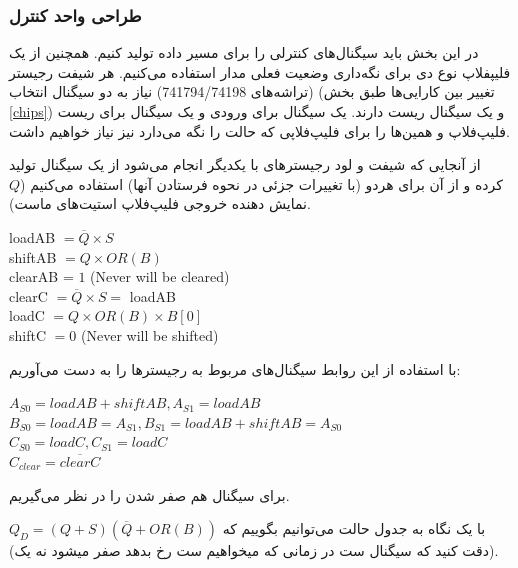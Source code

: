 \documentclass{article}
\begin{document}
\subsubsection{طراحی واحد کنترل}
در این بخش باید سیگنال‌های کنترلی را برای مسیر داده تولید کنیم. همچنین از یک فلیپفلاپ نوع دی برای نگه‌داری وضعیت فعلی مدار استفاده می‌کنیم. هر شیفت رجیستر (تراشه‌های 741794/74198) نیاز به دو سیگنال انتخاب (تغییر بین کارایی‌ها طبق بخش \ref{chips}) و یک سیگنال ریست دارند. یک سیگنال برای ورودی و یک سیگنال برای ریست فلیپ‌فلاپ  و همین‌ها را برای فلیپ‌فلاپی که حالت را نگه می‌دارد نیز نیاز خواهیم داشت. 

از آنجایی که شیفت و لود رجیسترهای  با یکدیگر انجام می‌شود از یک سیگنال تولید کرده و از آن برای هردو (با تغییرات جزئی در نحوه فرستادن آنها) استفاده می‌کنیم ($Q$ نمایش دهنده خروجی فلیپ‌فلاپ استیت‌های ماست).

\begin{latin}
\noindent
loadAB $= \overline{Q} \times S$\\
shiftAB $= Q  \times OR(B)$\\
clearAB = $1$ (Never will be cleared)\\
clearC $= \overline{Q} \times S = $ loadAB\\
loadC $= Q  \times OR(B) \times B[0]$\\
shiftC $= 0$ (Never will be shifted)
\end{latin}

با استفاده از این روابط سیگنال‌های مربوط به رجیسترها را به دست می‌آوریم:
\begin{latin}
\noindent
$A_{S0} = loadAB + shiftAB ,A_{S1} = loadAB$\\
$B_{S0} = loadAB = A_{S1} ,B_{S1} = loadAB + shiftAB = A_{S0}$\\
$C_{S0} = loadC ,C_{S1} = loadC$\\
$C_{clear} = \overline{clearC}$
\end{latin}

برای سیگنال  هم صفر شدن  را در نظر می‌گیریم.


با یک نگاه به جدول حالت می‌توانیم بگوییم که
$Q_D = (Q+S)(\overline{Q}+OR(B))$
(دقت کنید که سیگنال ست در زمانی که میخواهیم ست رخ بدهد صفر میشود نه یک).
\end{document}
